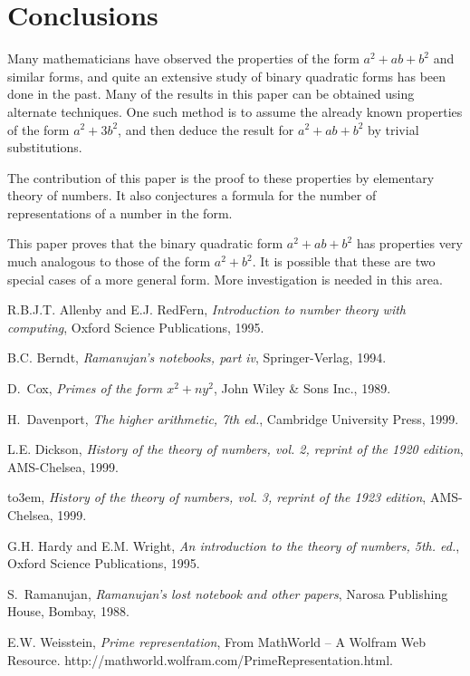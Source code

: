 \documentclass[reqno]{amsart}
\newcommand{\bq}[2]{\ensuremath{{#1}^2 + {#1}{#2} + {#2}^2}}
\newcommand{\bqab}{\bq{a}{b}}
\begin{document}
\section{Conclusions}
Many mathematicians have observed the properties of the form
\bqab{} and similar forms, and quite an extensive study of
binary quadratic forms has been done in the past.  Many of
the results in this paper can be obtained using alternate
techniques.  One such method is to assume the already known
properties of the form $a^2+3b^2$, and then deduce the
result for \bqab{} by trivial substitutions.

The contribution of this paper is the proof to these
properties by elementary theory of numbers.  It also
conjectures a formula for the number of representations of a
number in the form.

This paper proves that the binary quadratic form \bqab{} has
properties very much analogous to those of the form
$a^2+b^2$.   It is possible that these are two special cases
of a more general form.  More investigation is needed in
this area.

\providecommand{\bysame}{\leavevmode\hbox to3em{\hrulefill}\thinspace}
\providecommand{\MR}{\relax\ifhmode\unskip\space\fi MR }
\providecommand{\MRhref}[2]{%
  \href{http://www.ams.org/mathscinet-getitem?mr=#1}{#2}
}
\providecommand{\href}[2]{#2}
\begin{thebibliography}{1}

R.B.J.T. Allenby and E.J. RedFern, \emph{Introduction to number theory with
  computing}, Oxford Science Publications, 1995.

B.C. Berndt, \emph{Ramanujan's notebooks, part iv}, Springer-Verlag, 1994.

D.~Cox, \emph{Primes of the form $x^2+ny^2$}, John Wiley \& Sons Inc., 1989.

H.~Davenport, \emph{The higher arithmetic, 7th ed.}, Cambridge University
  Press, 1999.

L.E. Dickson, \emph{History of the theory of numbers, vol. 2, reprint of the
  1920 edition}, AMS-Chelsea, 1999.

\bysame, \emph{History of the theory of numbers, vol. 3, reprint of the 1923
  edition}, AMS-Chelsea, 1999.

G.H. Hardy and E.M. Wright, \emph{An introduction to the theory of numbers,
  5th. ed.}, Oxford Science Publications, 1995.

S.~Ramanujan, \emph{Ramanujan's lost notebook and other papers}, Narosa
  Publishing House, Bombay, 1988.

E.W. Weisstein, \emph{Prime representation}, From MathWorld -- A Wolfram Web
  Resource. http://mathworld.wolfram.com/PrimeRepresentation.html.

\end{thebibliography}
\end{document}

